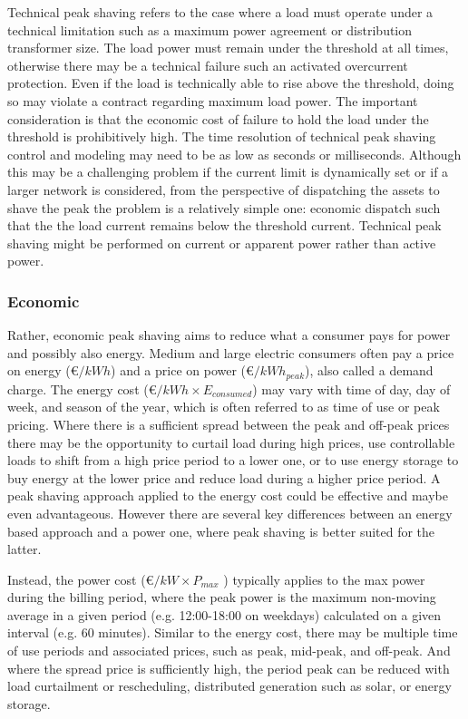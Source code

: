 \documentclass[journal,article,submit,pdftex,moreauthors]{Definitions/mdpi}
\begin{document}
Technical peak shaving refers to the case where a load must operate
under a technical limitation such as a maximum power agreement or
distribution transformer size. The load power must remain under the
threshold at all times, otherwise there may be a technical failure such
an activated overcurrent protection. Even if the load is technically
able to rise above the threshold, doing so may violate a contract
regarding maximum load power. The important consideration is that the
economic cost of failure to hold the load under the threshold is
prohibitively high. The time resolution of technical peak shaving
control and modeling may need to be as low as seconds or milliseconds.
Although this may be a challenging problem if the current limit is
dynamically set or if a larger network is considered, from the
perspective of dispatching the assets to shave the peak the problem is a
relatively simple one: economic dispatch such that the the load current
remains below the threshold current. Technical peak shaving might be
performed on current or apparent power rather than active power.

\subsubsection{Economic}\label{economic}%

Rather, economic peak shaving aims to reduce what a consumer pays for
power and possibly also energy. Medium and large electric consumers
often pay a price on energy (€\(/kWh\)) and a price on power
(€\(/kWh_{peak}\)), also called a demand charge. The energy cost
(€\(/kWh \times E_{consumed}\)) may vary with time of day, day of week,
and season of the year, which is often referred to as time of use or
peak pricing. Where there is a sufficient spread between the peak and
off-peak prices there may be the opportunity to curtail load during high
prices, use controllable loads to shift from a high price period to a
lower one, or to use energy storage to buy energy at the lower price and
reduce load during a higher price period. A peak shaving approach
applied to the energy cost could be effective and maybe even
advantageous. However there are several key differences between an
energy based approach and a power one, where peak shaving is better
suited for the latter.

Instead, the power cost (€\(/kW \times P_{max}\) ) typically applies to
the max power during the billing period, where the peak power is the
maximum non-moving average in a given period (e.g. 12:00-18:00 on
weekdays) calculated on a given interval (e.g. 60 minutes). Similar to
the energy cost, there may be multiple time of use periods and
associated prices, such as peak, mid-peak, and off-peak. And where the
spread price is sufficiently high, the period peak can be reduced with
load curtailment or rescheduling, distributed generation such as solar,
or energy storage.
\end{document}
